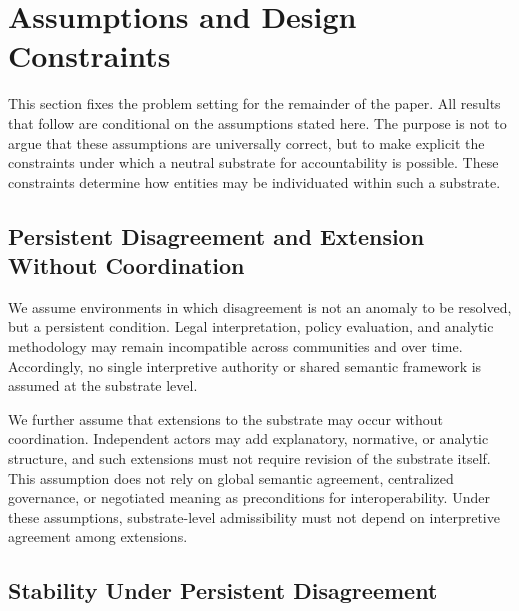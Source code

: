 \section{Assumptions and Design Constraints}
\label{sec:assumptions}

This section fixes the problem setting for the remainder of the paper.
All results that follow are conditional on the assumptions stated here.
The purpose is not to argue that these assumptions are universally correct,
but to make explicit the constraints under which a neutral substrate for
accountability is possible.
These constraints determine how entities may be individuated within such
a substrate.

\subsection{Persistent Disagreement and Extension Without Coordination}

We assume environments in which disagreement is not an anomaly to be
resolved, but a persistent condition.
Legal interpretation, policy evaluation, and analytic methodology may remain
incompatible across communities and over time.
Accordingly, no single interpretive authority or shared semantic framework
is assumed at the substrate level.

We further assume that extensions to the substrate may occur without
coordination.
Independent actors may add explanatory, normative, or analytic structure,
and such extensions must not require revision of the substrate itself.
This assumption does not rely on
global semantic agreement, centralized governance, or
negotiated meaning as preconditions for interoperability.
Under these assumptions,
substrate-level admissibility must not depend
on interpretive agreement among extensions.

\subsection{Stability Under Persistent Disagreement}

